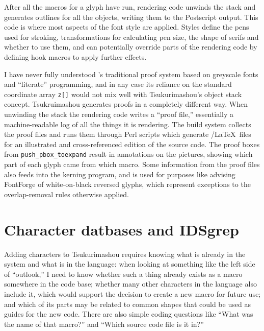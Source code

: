 \documentclass{ltugboat}
\begin{document}
After all the macros for a glyph have run, rendering code unwinds the stack
and generates outlines for all the objects, writing them to the Postscript
output.  This code is where most aspects of the font style are applied. 
Styles define the pens used for stroking, transformations for calculating
pen size, the shape of serifs and whether to use them, and can potentially
override parts of the rendering code by defining hook macros to apply
further effects.

I have never fully understood \MF's traditional proof system based on
greyscale fonts and ``literate'' programming, and in any case its reliance
on the standard coordinate array \verb|z[]| would not mix well with
Tsukurimashou's object stack concept.  Tsukruimashou generates proofs in a
completely different way.  When unwinding the stack the rendering code
writes a ``proof file,'' essentially a machine-readable log of all the
things it is rendering.  The build system collects the proof files and runs
them through Perl scripts which generate \TikZ/\LaTeX\ files for an
illustrated and cross-referenced edition of the source code.  The proof
boxes from \verb|push_pbox_toexpand| result in annotations on the pictures,
showing which part of each glyph came from which macro.  Some information
from the proof files also feeds into the kerning program, and is used for
purposes like advising FontForge of white-on-black reversed glyphs, which
represent exceptions to the overlap-removal rules otherwise
applied.


\section{Character datbases and IDSgrep}

Adding characters to Tsukurimashou requires knowing what is already in the
system and what is in the language: when looking at something like the left
side of ``outlook,'' I need to know whether such a thing already exists as a
macro somewhere in the code base; whether many other characters in the
language also include it, which would support the decision to create a new
macro for future use; and which of its parts may be related to common shapes
that could be used as guides for the new code.  There are also simple coding
questions like ``What was the name of that macro?'' and ``Which source code
file is it in?''
\end{document}
